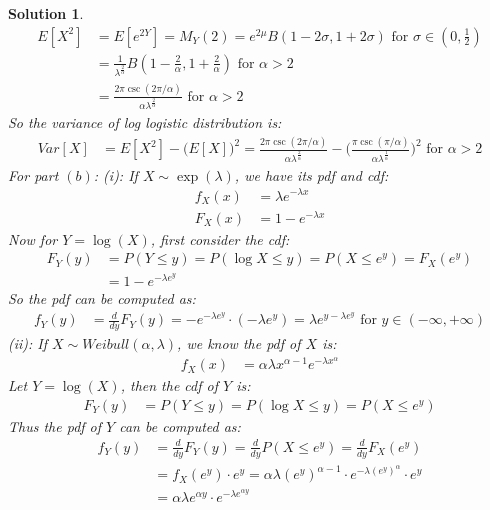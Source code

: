 \documentclass[11pt]{article}
\newtheorem{sol}{Solution}
\begin{document}
\begin{sol}
\begin{align*}
		E[X^2] &= E[e^{2Y}] = M_Y(2) = e^{2\mu}B(1 - 2\sigma, 1 + 2\sigma) \text{ for }\sigma \in (0, \frac{1}{2})\\
		&= \frac{1}{\lambda^{\frac{2}{\alpha}}}B(1 - \frac{2}{\alpha}, 1 + \frac{2}{\alpha}) \text{ for }\alpha > 2\\
		&= \frac{2\pi\csc(2\pi/\alpha)}{\alpha\lambda^{\frac{2}{\alpha}}} \text{ for }\alpha > 2
	\end{align*}
	So the variance of log logistic distribution is:
	\begin{align*}
		Var[X] &= E[X^2] - \Big(E[X]\Big)^2 = \frac{2\pi\csc(2\pi/\alpha)}{\alpha\lambda^{\frac{2}{\alpha}}} - \Big(\frac{\pi\csc(\pi/\alpha)}{\alpha\lambda^{\frac{1}{\alpha}}}\Big)^2 \text{ for }\alpha > 2
	\end{align*}
	For part $(b)$:\vskip 2mm
	(i): If $X \sim \exp(\lambda)$, we have its pdf and cdf:
	\begin{align*}
		f_X(x) &= \lambda e^{-\lambda x}\\
		F_X(x) &= 1 - e^{-\lambda x}
	\end{align*}
	Now for $Y = \log (X)$, first consider the cdf:
	\begin{align*}
		F_Y(y) &= P(Y \leq y) = P(\log X \leq y) = P(X \leq e^y) = F_X(e^y)\\
		&= 1 - e^{-\lambda e^y}
	\end{align*}
	So the pdf can be computed as:
	\begin{align*}
		f_Y(y) &= \frac{d}{dy}F_Y(y) = -e^{-\lambda e^y}\cdot (-\lambda e^y) = \lambda e^{y - \lambda e^y} \text{ for } y \in (-\infty, +\infty)
	\end{align*}
	(ii): If $X \sim Weibull(\alpha, \lambda)$, we know the pdf of $X$ is:
	\begin{align*}
		f_X(x) &= \alpha\lambda x^{\alpha - 1}e^{-\lambda x^{\alpha}}
	\end{align*}
	Let $Y = \log(X)$, then the cdf of $Y$ is:
	\begin{align*}
		F_Y(y) &= P(Y \leq y) = P(\log X \leq y) = P(X \leq e^y)
	\end{align*}
	Thus the pdf of $Y$ can be computed as:
	\begin{align*}
		f_Y(y) &= \frac{d}{dy}F_Y(y) = \frac{d}{dy}P(X \leq e^y) = \frac{d}{dy}F_X(e^y)\\
		&= f_X(e^y)\cdot e^y = \alpha\lambda(e^y)^{\alpha - 1}\cdot e^{-\lambda (e^y)^{\alpha}}\cdot e^y\\
		&= \alpha\lambda e^{\alpha y}\cdot e^{-\lambda e^{\alpha y}}
	\end{align*}

\end{sol}
\end{document}
